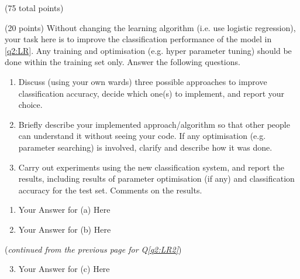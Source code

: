 \documentclass[12pt]{article}
\begin{document}
\begin{question}{(75 total points) \qTwoTitle}
\begin{subquestion}{(20 points)
    Without changing the learning algorithm (i.e. use logistic regression), your task here is to improve the classification performance of the model in \ref{q2:LR}.
    Any training and optimisation (e.g. hyper parameter tuning) should be done within the training set only.
    Answer the following questions.
  }\label{q2:LR2}
  \begin{enumerate}\NARROWITEM
  \item Discuss (using your own wards) three possible approaches to improve classification accuracy, decide which one(s) to implement, and report your choice.
  \item Briefly describe your implemented approach/algorithm so that other people can understand it without seeing your code. If any optimisation (e.g. parameter searching) is involved, clarify and describe how it was done.
  \item Carry out experiments using the new classification system, and report the results, including results of parameter optimisation (if any) and classification accuracy for the test set. Comments on the results.
  \end{enumerate}
   

  \begin{answerbox}{0.7\textheight}
    \begin{enumerate}
    \item Your Answer for (a) Here
    \item Your Answer for (b) Here
    \end{enumerate}
  \end{answerbox}
  \clearpage
  ({\it continued from the previous page for Q\ref{q2:LR2}})
  \begin{answerbox}{0.95\textheight}
    \begin{enumerate}\setcounter{enumi}{2}
    \item Your Answer for (c) Here
    \end{enumerate}
  \end{answerbox}
  


\end{subquestion}


\end{question}
\end{document}
